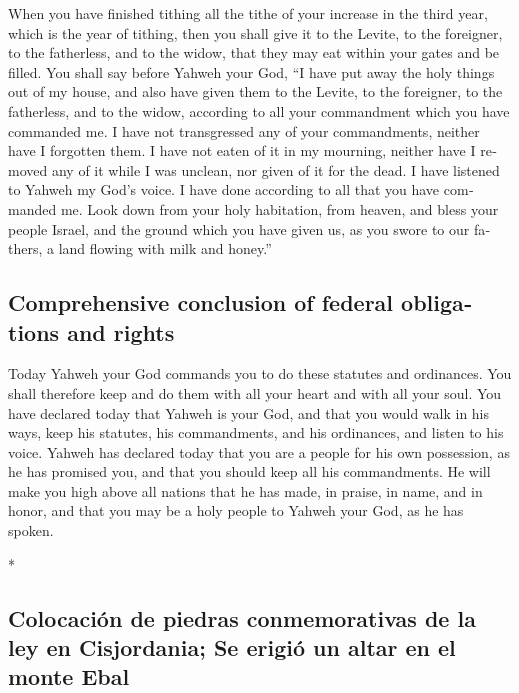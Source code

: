 \begin{paracol}{2}
\begin{otherlanguage}{english}
 When you have finished tithing all the tithe of your
increase in the third year, which is the year of tithing, then you shall
give it to the Levite, to the foreigner, to the fatherless, and to the
widow, that they may eat within your gates and be filled.
 You shall say before Yahweh your God, ``I have put away
the holy things out of my house, and also have given them to the Levite,
to the foreigner, to the fatherless, and to the widow, according to all
your commandment which you have commanded me. I have not transgressed
any of your commandments, neither have I forgotten them. 
I have not eaten of it in my mourning, neither have I removed any of it
while I was unclean, nor given of it for the dead. I have listened to
Yahweh my God's voice. I have done according to all that you have
commanded me.  Look down from your holy habitation, from
heaven, and bless your people Israel, and the ground which you have
given us, as you swore to our fathers, a land flowing with milk and
honey.''

\hypertarget{comprehensive-conclusion-of-federal-obligations-and-rights}{%
\subsection{Comprehensive conclusion of federal obligations and
rights}\label{comprehensive-conclusion-of-federal-obligations-and-rights}}

 Today Yahweh your God commands you to do these statutes
and ordinances. You shall therefore keep and do them with all your heart
and with all your soul.  You have declared today that
Yahweh is your God, and that you would walk in his ways, keep his
statutes, his commandments, and his ordinances, and listen to his voice.
 Yahweh has declared today that you are a people for his
own possession, as he has promised you, and that you should keep all his
commandments.  He will make you high above all nations
that he has made, in praise, in name, and in honor, and that you may be
a holy people to Yahweh your God, as he has spoken.

\end{otherlanguage}

\switchcolumn[0]*

\hypertarget{colocaciuxf3n-de-piedras-conmemorativas-de-la-ley-en-cisjordania-se-erigiuxf3-un-altar-en-el-monte-ebal}{%
\subsection{Colocación de piedras conmemorativas de la ley en
Cisjordania; Se erigió un altar en el monte
Ebal}\label{colocaciuxf3n-de-piedras-conmemorativas-de-la-ley-en-cisjordania-se-erigiuxf3-un-altar-en-el-monte-ebal}}


\end{paracol}
